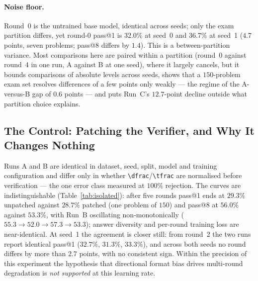 \documentclass[runningheads]{llncs}
\begin{document}
\paragraph{Noise floor.}
\label{sec:seedvar}
Round~0 is the untrained base model, identical across seeds; only the exam
partition differs, yet round-0 pass@1 is $32.0\%$ at seed~0 and $36.7\%$ at
seed~1 ($4.7$ points, seven problems; pass@8 differs by $1.4$). This is a
between-partition variance. Most comparisons here are paired within a partition
(round~0 against round~4 in one run, A against B at one seed), where it largely
cancels, but it bounds comparisons of absolute levels across seeds, shows that a
$150$-problem exam set resolves differences of a few points only weakly --- the
regime of the A-versus-B gap of $0.6$ points --- and puts Run~C's $12.7$-point
decline outside what partition choice explains.

\subsection{The Control: Patching the Verifier, and Why It Changes Nothing}
\label{sec:control}
\label{sec:prevalence}

Runs A and B are identical in dataset, seed, split, model and training
configuration and differ only in whether \verb|\dfrac|/\verb|\tfrac| are
normalised before verification --- the one error class measured at $100\%$
rejection. The curves are indistinguishable (Table~\ref{tab:isolated}): after five
rounds pass@1 ends at $29.3\%$ unpatched against $28.7\%$ patched (one problem of
$150$) and pass@8 at $56.0\%$ against $53.3\%$, with Run~B oscillating
non-monotonically ($55.3\to52.0\to57.3\to53.3$); answer diversity and per-round
training loss are near-identical. At seed~1 the agreement is closer still: from
round~2 the two runs report identical pass@1 ($32.7\%$, $31.3\%$, $33.3\%$), and
across both seeds no round differs by more than $2.7$ points, with no consistent
sign. Within the precision of this experiment the hypothesis that directional
format bias drives multi-round degradation is \emph{not supported} at this
learning rate.
\end{document}
